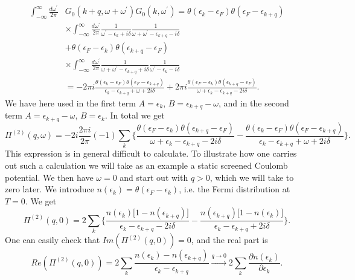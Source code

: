 \begin{align*}
\int_{-\infty}^{\infty}\frac{d\omega^{\prime}}{2\pi}&G_0(k+q,\omega+\omega^{\prime})G_0(k,\omega^{\prime})=\theta(\epsilon_k-\epsilon_F)\theta(\epsilon_F-\epsilon_{k+q})\\
&\times\int_{-\infty}^{\infty}\frac{d\omega^{\prime}}{2\pi}\frac{1}{\omega^{\prime}-\epsilon_k+i\delta}\frac{1}{\omega+\omega^{\prime}-\epsilon_{k+q}-i\delta}\\
&+\theta(\epsilon_F-\epsilon_k)\theta(\epsilon_{k+q}-\epsilon_F)\\
&\times\int_{-\infty}^{\infty}\frac{d\omega^{\prime}}{2\pi}\frac{1}{\omega+\omega^{\prime}-\epsilon_{k+q}+i\delta}\frac{1}{\omega^{\prime}-\epsilon_k-i\delta}\\
&=-2\pi i\frac{\theta(\epsilon_k-\epsilon_F)\theta(\epsilon_F-\epsilon_{k+q})}{\epsilon_k-\epsilon_{k+q}+\omega+2i\delta}+2\pi i\frac{\theta(\epsilon_F-\epsilon_k)\theta(\epsilon_{k+q}-\epsilon_F)}{\omega+\epsilon_k-\epsilon_{k+q}-2i\delta}.
\end{align*}
We have here used in the first term $A=\epsilon_k$, $B=\epsilon_{k+q}-\omega$, and in the second term $A=\epsilon_{k+q}-\omega$, $B=\epsilon_k$. In total we get
\begin{equation}
\Pi^{(2)}(q,\omega)=-2i\frac{2\pi i}{2\pi}(-1)\sum_{k}\{\frac{\theta(\epsilon_F-\epsilon_k)\theta(\epsilon_{k+q}-\epsilon_F)}{\omega+\epsilon_k-\epsilon_{k+q}-2i\delta}-\frac{\theta(\epsilon_k-\epsilon_F)\theta(\epsilon_F-\epsilon_{k+q})}{\epsilon_k-\epsilon_{k+q}+\omega+2i\delta}\}.
\end{equation}
This expression is in general difficult to calculate. To illustrate how one carries out such a calculation we will take as an example a static screened Coulomb potential. We then have $\omega=0$ and start out with $q>0$, which we will take to zero later. We introduce $n(\epsilon_k)=\theta(\epsilon_F-\epsilon_k)$, i.e. the Fermi distribution at $T=0$. We get
\begin{equation}
\Pi^{(2)}(q,0)=2\sum_k\{\frac{n(\epsilon_k)\big[1-n(\epsilon_{k+q})\big]}{\epsilon_k-\epsilon_{k+q}-2i\delta}-\frac{n(\epsilon_{k+q})\big[1-n(\epsilon_k)\big]}{\epsilon_k-\epsilon_{k+q}+2i\delta}\}.
\end{equation}
One can easily check that $Im(\Pi^{(2)}(q,0))=0$, and the real part is
\begin{equation}
Re(\Pi^{(2)}(q,0))=2\sum_k\frac{n(\epsilon_k)-n(\epsilon_{k+q})}{\epsilon_k-\epsilon_{k+q}}\stackrel{q\rightarrow 0}{\rightarrow}2\sum_k\frac{\partial n(\epsilon_k)}{\partial \epsilon_k}.
\end{equation}
